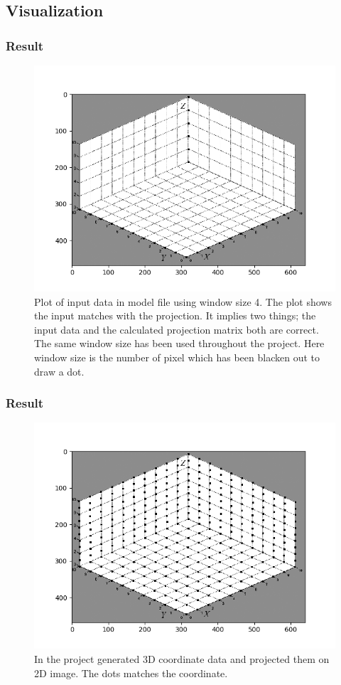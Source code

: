 \documentclass[11pt]{beamer}
\begin{document}
\subsection{Visualization}
\begin{frame}
\frametitle{Result}
\begin{figure}
\centering
\includegraphics[height=.6\textheight]{Figure_1-1.png}\vfill
\caption{Plot of input data in model file using window size 4. The plot shows the input matches with the projection. It implies two things; the input data and the calculated projection matrix both are correct. The same window size has been used throughout the project. Here window size is the number of pixel which has been blacken out to draw a dot.}
\end{figure}
\end{frame}

\begin{frame}
\frametitle{Result}
\begin{figure}
\centering
\includegraphics[height=.6\textheight]{Figure_1.png}\vfill
\caption{In the project generated 3D coordinate data and projected them on 2D image. The dots matches the coordinate.}
\end{figure}
\end{frame}
\end{document}
